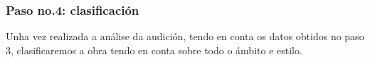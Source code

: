 \subsubsection*{Paso no.4: clasificación} 
Unha vez realizada a análise da audición, tendo en conta os datos obtidos no paso 3, clasificaremos a obra tendo en conta sobre todo o ámbito e estilo.
%
%
\vspace*{0.25cm}
\begin{ejercicio}

%

        \vspace*{2.78cm}
\end{ejercicio}

%